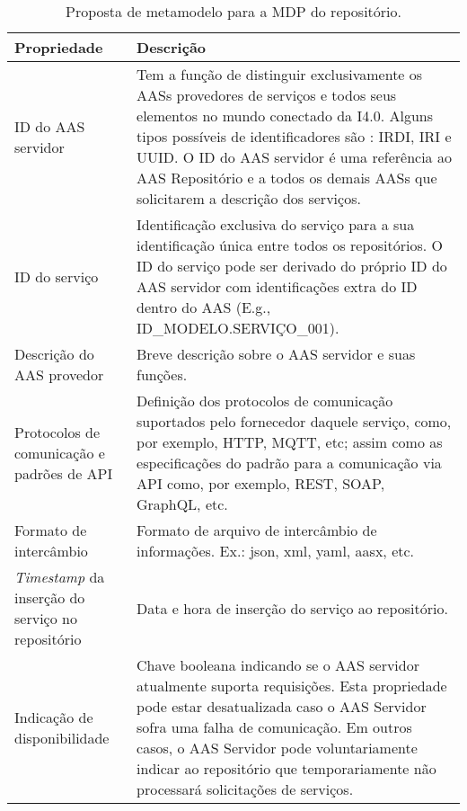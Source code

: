 	\begin{table}[htb]
		\centering
		\caption{Proposta de metamodelo para a MDP do repositório.}
		\label{tab:mdp-repositorio}
		\begin{tabular}{p{3cm}p{12cm}}
			\hline
			\textbf{Propriedade}
			& \textbf{Descrição} \\ 
			
			\hline
			ID do AAS servidor
			& Tem a função de distinguir exclusivamente os AASs provedores de serviços e todos seus elementos \cite{adolphs2016structure} no mundo conectado da I4.0. Alguns tipos possíveis de identificadores são \cite{bader2019aas}: IRDI, IRI e UUID. O ID do AAS servidor é uma referência ao AAS Repositório e a todos os demais AASs que solicitarem a descrição dos serviços. \\
			
			\hline
			ID do serviço
			& Identificação exclusiva do serviço para a sua identificação única entre todos os repositórios. O ID do serviço pode ser derivado do próprio ID do AAS servidor com identificações extra do ID dentro do AAS (E.g., ID\_MODELO.SERVIÇO\_001). \\
			
			\hline
			Descrição do AAS provedor
			& Breve descrição sobre o AAS servidor e suas funções. \\
			
			\hline
			Protocolos de comunicação e padrões de API
			& Definição dos protocolos de comunicação suportados pelo fornecedor daquele serviço, como, por exemplo, HTTP, MQTT, etc; assim como as especificações do padrão para a comunicação via API como, por exemplo, REST, SOAP, GraphQL, etc.   \\
		
			\hline
			Formato de intercâmbio
			& Formato de arquivo de intercâmbio de informações. Ex.: json, xml, yaml, aasx, etc.  \\
			
			\hline
			\textit{Timestamp} da inserção do serviço no repositório
			& Data e hora de inserção do serviço ao repositório. \\
			
			\hline
			Indicação de disponibilidade
			& Chave booleana indicando se o AAS servidor atualmente suporta requisições. Esta propriedade pode estar desatualizada caso o AAS Servidor sofra uma falha de comunicação. Em outros casos, o AAS Servidor pode voluntariamente indicar ao repositório que temporariamente não processará solicitações de serviços. \\
			

\end{tabular}
\end{table}
